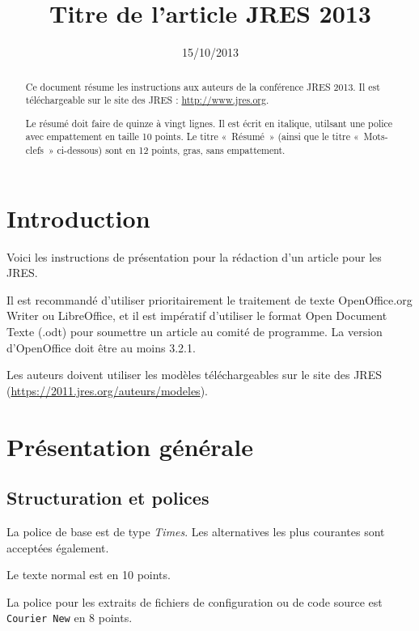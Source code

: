 \documentclass{jres}
\title{Titre de l'article JRES 2013}
\date{15/10/2013}
\begin{document}
\maketitle

\begin{abstract}
Ce document résume les instructions aux auteurs de la conférence JRES 2013.
Il est téléchargeable sur le site des JRES : \url{http://www.jres.org}.

Le résumé doit faire de quinze à vingt lignes. Il est écrit en italique,
utilsant une police avec empattement en taille  10 points. 
Le titre « Résumé » (ainsi que le titre «~Mots-clefs~» ci-dessous) 
sont en 12 points, gras, sans empattement.
\end{abstract}


\section{Introduction}

Voici les instructions de présentation pour la rédaction d'un article
pour les JRES.  


Il est recommandé d'utiliser prioritairement le
traitement de texte OpenOffice.org Writer ou LibreOffice, et il est
impératif d'utiliser le format Open Document Texte (.odt) pour
soumettre un article au comité de programme. 
La version d'OpenOffice doit être au moins 3.2.1.  

Les auteurs doivent utiliser les modèles téléchargeables sur le site
des JRES (\url{https://2011.jres.org/auteurs/modeles}).

\section{Présentation générale}

\subsection{Structuration et polices}

La police de base est de type \emph{Times}. Les alternatives les plus
courantes sont acceptées également.

Le texte  normal est en 10 points.

La police pour les extraits de fichiers de configuration ou de code source est \texttt{Courier New} en 8 points.
\end{document}
